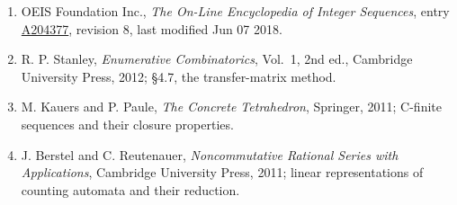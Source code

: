 \documentclass[11pt]{article}
\theoremstyle{definition}
\begin{document}
\begin{enumerate}

\item OEIS Foundation Inc., \emph{The On-Line Encyclopedia of Integer Sequences}, entry \href{https://oeis.org/A204377}{A204377}, revision 8, last modified Jun 07 2018.

\item R. P. Stanley, \emph{Enumerative Combinatorics}, Vol.~1, 2nd ed., Cambridge University Press, 2012; \S4.7, the transfer-matrix method.

\item M. Kauers and P. Paule, \emph{The Concrete Tetrahedron}, Springer, 2011; C-finite sequences and their closure properties.

\item J. Berstel and C. Reutenauer, \emph{Noncommutative Rational Series with Applications}, Cambridge University Press, 2011; linear representations of counting automata and their reduction.

\end{enumerate}
\end{document}
